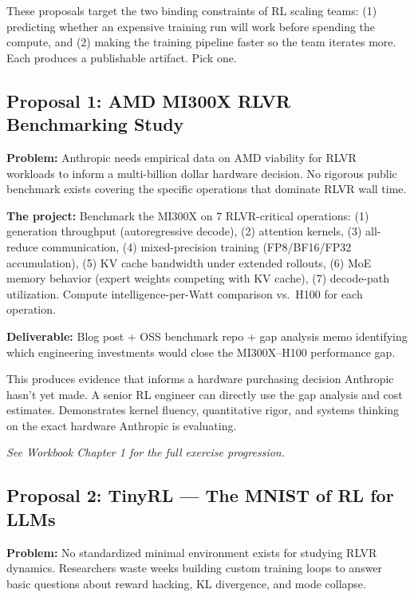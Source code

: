 \begin{bluf}
These proposals target the two binding constraints of RL scaling teams: (1) predicting whether an expensive training run will work before spending the compute, and (2) making the training pipeline faster so the team iterates more. Each produces a publishable artifact. Pick one.
\end{bluf}

\subsection{Proposal 1: AMD MI300X RLVR Benchmarking Study}

\textbf{Problem:} Anthropic needs empirical data on AMD viability for RLVR workloads to inform a multi-billion dollar hardware decision. No rigorous public benchmark exists covering the specific operations that dominate RLVR wall time.

\textbf{The project:} Benchmark the MI300X on 7 RLVR-critical operations: (1) generation throughput (autoregressive decode), (2) attention kernels, (3) all-reduce communication, (4) mixed-precision training (FP8/BF16/FP32 accumulation), (5) KV cache bandwidth under extended rollouts, (6) MoE memory behavior (expert weights competing with KV cache), (7) decode-path utilization. Compute intelligence-per-Watt comparison vs.\ H100 for each operation.

\textbf{Deliverable:} Blog post + OSS benchmark repo + gap analysis memo identifying which engineering investments would close the MI300X--H100 performance gap.

\begin{whyanthro}
This produces evidence that informs a hardware purchasing decision Anthropic hasn't yet made. A senior RL engineer can directly use the gap analysis and cost estimates. Demonstrates kernel fluency, quantitative rigor, and systems thinking on the exact hardware Anthropic is evaluating.
\end{whyanthro}

\smallskip\noindent\textit{See Workbook Chapter 1 for the full exercise progression.}

\subsection{Proposal 2: TinyRL --- The MNIST of RL for LLMs}

\textbf{Problem:} No standardized minimal environment exists for studying RLVR dynamics. Researchers waste weeks building custom training loops to answer basic questions about reward hacking, KL divergence, and mode collapse.

